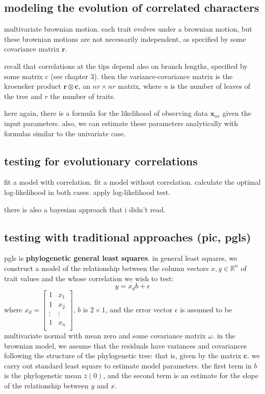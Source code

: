 \documentclass{article}
\begin{document}
\subsection{modeling the evolution of correlated characters}
multivariate brownian motion. each trait evolves under a brownian motion, but
these brownian motions are not necessarily independent, as specified by some
covariance matrix $\mathbf{r}$.

recall that correlations at the tips depend also on branch lengths, specified by
some matrix $c$ (see chapter 3). then the variance-covariance matrix is the
kroeneker product $\mathbf{r}\otimes \mathbf{c}$, an $nr\times nr$ matrix, where
$n$ is the number of leaves of the tree and $r$ the number of traits.

here again, there is a formula for the likelihood of observing data
$\mathbf{x}_{nr}$ given the input parameters. also, we can estimate these
parameters analytically with formulas similar to the univariate case.

\subsection{testing for evolutionary correlations}
fit a model with correlation. fit a model without correlation. calculate the
optimal log-likelihood in both cases. apply log-likelihood test.

there is also a bayesian approach that i didn't read.

\subsection{testing with traditional approaches (pic, pgls)}

pgls is \textbf{phylogenetic general least squares}. in general least squares,
we construct a model of the relationship between the column vectors
$x,y\in \mathbb{R}^{n}$ of trait values and the whose correlation we wish to test:
\begin{equation*}
  y = x_{d}b + \epsilon
\end{equation*}
where
$x_{d} = \begin{bmatrix} 1 & x_1 \\ 1 & x_2 \\ \vdots & \vdots \\ 1 & x_n
  \\ \end{bmatrix}$, $b$ is $2\times 1$, and the error vector $\epsilon$ is
assumed to be multivariate normal with mean zero and some covariance matrix
$\omega$. in the brownian model, we assume that the residuals have variances and
covariances following the structure of the phylogenetic tree: that is, given by
the matrix $\mathbf{c}$. we carry out standard least square to estimate model
parameters. the first term in $b$ is the phylogenetic mean $\overline{z}(0)$,
and the second term is an estimate for the slope of the relationship between $y$
and $x$.
\end{document}
